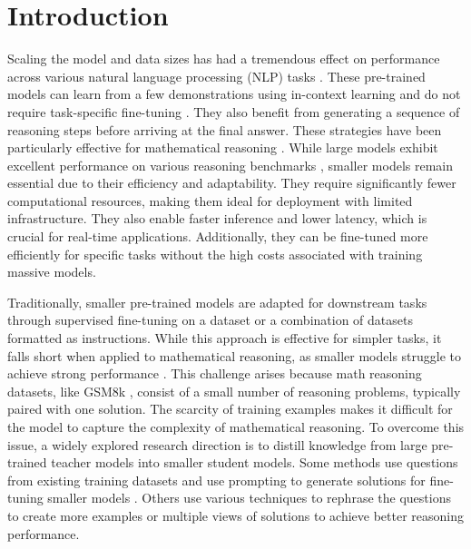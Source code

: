 \section{Introduction}
Scaling the model and data sizes has had a tremendous effect on performance across various natural language processing (NLP) tasks \citep{chowdhery2023palm, achiam2023gpt, touvron2023llama2, jiang2023mistral}. These pre-trained models can learn from a few demonstrations using in-context learning and do not require task-specific fine-tuning \citep{brown2020language}. They also benefit from generating a sequence of reasoning steps before arriving at the final answer. These strategies have been particularly effective for mathematical reasoning \citep{wei2022chain, nye2022show, fu2022complexity, zhou2022least}. While large models exhibit excellent performance on various reasoning benchmarks \citep{lambert2024t, liu2024deepseek, jaech2024openai}, smaller models remain essential due to their efficiency and adaptability. They require significantly fewer computational resources, making them ideal for deployment with limited infrastructure. They also enable faster inference and lower latency, which is crucial for real-time applications. Additionally, they can be fine-tuned more efficiently for specific tasks without the high costs associated with training massive models.



Traditionally, smaller pre-trained models are adapted for downstream tasks through supervised fine-tuning on a dataset or a combination of datasets formatted as instructions. While this approach is effective for simpler tasks, it falls short when applied to mathematical reasoning, as smaller models struggle to achieve strong performance \citep{wei2022emergent}. This challenge arises because math reasoning datasets, like GSM8k \citep{cobbe2021training}, consist of a small number of reasoning problems, typically paired with one solution. The scarcity of training examples makes it difficult for the model to capture the complexity of mathematical reasoning. To overcome this issue, a widely explored research direction is to distill knowledge from large pre-trained teacher models into smaller student models. Some methods use questions from existing training datasets and use prompting to generate solutions for fine-tuning smaller models \citep{ho2023large, magister2023teaching, fu2023specializing, hsieh2023distilling, yuemammoth}. Others use various techniques to rephrase the questions to create more examples \citep{yu2024metamath} or multiple views of solutions \citep{liang2024mint} to achieve better reasoning performance.

